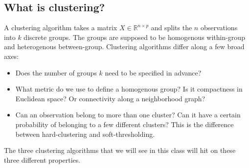 \subsection{What is clustering?}

A clustering algorithm takes a matrix $X \in \mathbb{R}^{n \times p}$ and splits the $n$ observations into $k$ discrete groups. The groups are supposed to be homogenous within-group and heterogenous between-group. Clustering algorithms differ along a few broad axes:
\begin{itemize}
\item Does the number of groups $k$ need to be specified in advance?
\item What metric do we use to define a homogenous group? Is it compactness in Euclidean space? Or connectivity along a neighborhood graph? 	
\item Can an observation belong to more than one cluster? Can it have a certain probability of belonging to a few different clusters? This is the difference between hard-clustering and soft-thresholding. 
\end{itemize}

The three clustering algorithms that we will see in this class will hit on these three different properties.

